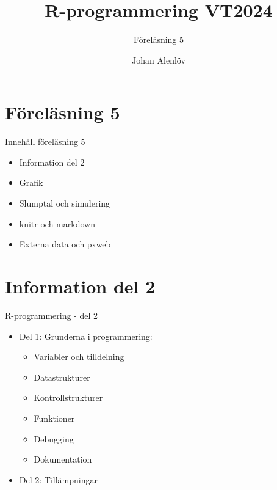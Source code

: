 \documentclass[
  11pt,
  ignorenonframetext,
  handout]{beamer}
\title{R-programmering VT2024}
\subtitle{Föreläsning 5}
\author{Johan Alenlöv}
\date{}
\institute{Linköpings Universitet}
\providecommand{\tightlist}{%
  \setlength{\itemsep}{0pt}\setlength{\parskip}{0pt}}
\begin{document}
\frame{\titlepage}

\section{Föreläsning 5}\label{fuxf6reluxe4sning-5}

\begin{frame}{Innehåll föreläsning 5}
\label{innehuxe5ll-fuxf6reluxe4sning-5}
\begin{itemize}
\tightlist
\item
  Information del 2
\item
  Grafik
\item
  Slumptal och simulering
\item
  knitr och markdown
\item
  Externa data och pxweb
\end{itemize}
\end{frame}

\section{Information del 2}\label{information-del-2}

\begin{frame}{R-programmering - del 2}
\label{r-programmering---del-2}
\begin{itemize}
\tightlist
\item
  Del 1: Grunderna i programmering:

  \begin{itemize}
  \tightlist
  \item
    Variabler och tilldelning
  \item
    Datastrukturer
  \item
    Kontrollstrukturer
  \item
    Funktioner
  \item
    Debugging
  \item
    Dokumentation
  \end{itemize}
\item
  Del 2: Tillämpningar
\end{itemize}
\end{frame}
\end{document}
